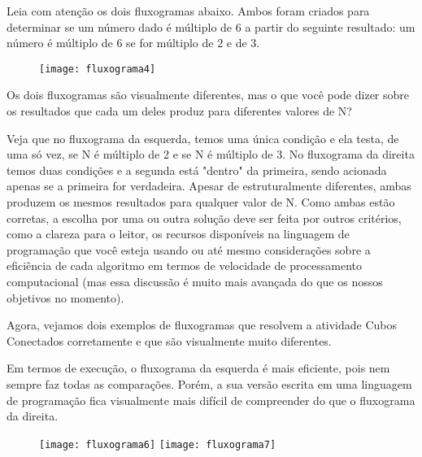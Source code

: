 \label{comp-arr4}

Leia com atenção os dois fluxogramas abaixo. Ambos foram criados para determinar se um número dado é múltiplo de 6 a partir do seguinte resultado: um número é múltiplo de $6$ se for múltiplo de $2$ e de $3$.

\begin{figure}[H]
\centering

\texttt{[image: fluxograma4]}
\end{figure}

\begin{reflection}
Os dois fluxogramas são visualmente diferentes, mas o que você pode dizer sobre os resultados que cada um deles produz para diferentes valores de N?
\end{reflection}

Veja que no fluxograma da esquerda, temos uma única condição e ela testa, de uma só vez, se N é múltiplo de 2 e se N é múltiplo de 3. No fluxograma da direita temos duas condições e a segunda está "dentro"{} da primeira, sendo acionada apenas se a primeira for verdadeira. Apesar de estruturalmente diferentes, ambas produzem os mesmos resultados para qualquer valor de N. Como ambas estão corretas, a escolha por uma ou outra solução deve ser feita por outros critérios, como a clareza para o leitor, os recursos disponíveis na linguagem de programação que você esteja usando ou até mesmo considerações sobre a eficiência de cada algoritmo em termos de velocidade de processamento computacional (mas essa discussão é muito mais avançada do que os nossos objetivos no momento).

Agora, vejamos dois exemplos de fluxogramas que resolvem a atividade Cubos Conectados corretamente e que são visualmente muito diferentes.

\clearmargin
\begin{texto}
{
	Em termos de execução, o fluxograma da esquerda é mais eficiente, pois nem sempre faz todas as comparações. Porém, a sua versão escrita em uma linguagem de programação fica visualmente mais difícil de compreender do que o fluxograma da direita.
}
\end{texto}

\begin{figure}[H]
\centering

\texttt{[image: fluxograma6]}
\hspace{1em}
\texttt{[image: fluxograma7]}
\end{figure}

